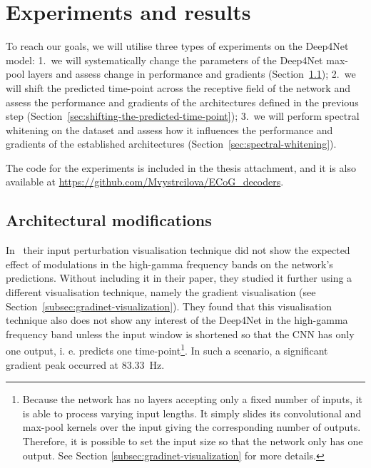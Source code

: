 \chapter{Experiments and results}
\label{ch:exp}

To reach our goals, we will utilise three types of experiments on the Deep4Net model:
1.~we will systematically change the parameters of the Deep4Net max-pool layers and assess change in performance and gradients (Section~\ref{sec:architectural-modifications}); 2.~we will shift the predicted time-point across the receptive field of the network and assess the performance and gradients of the architectures defined in the previous step (Section~\ref{sec:shifting-the-predicted-time-point}); 3.~we will perform spectral whitening on the dataset and assess how it influences the performance and gradients of the established architectures (Section~\ref{sec:spectral-whitening}). 

The code for the experiments is included in the thesis attachment, and it is also available at \url{https://github.com/Mvystrcilova/ECoG_decoders}. 

\section{Architectural modifications}\label{sec:architectural-modifications}
In~\cite{Hammer-2021} their input perturbation visualisation technique did not show the expected effect of modulations in the high-gamma frequency bands on the network's predictions.
Without including it in their paper, they studied it further using a different visualisation technique, namely the gradient visualisation (see Section~\ref{subsec:gradinet-visualization}). 
They found that this visualisation technique also does not show any interest of the Deep4Net in the high-gamma frequency band unless the input window is shortened so that the CNN has only one output, i. e. predicts one time-point\footnote{Because the network has no layers accepting only a fixed number of inputs, it is able to process varying input lengths. It simply slides its convolutional and max-pool kernels over the input giving the corresponding number of outputs. Therefore, it is possible to set the input size so that the network only has one output. See Section \ref{subsec:gradinet-visualization} for more details.}.
In such a scenario, a significant gradient peak occurred at 83.33~Hz.


